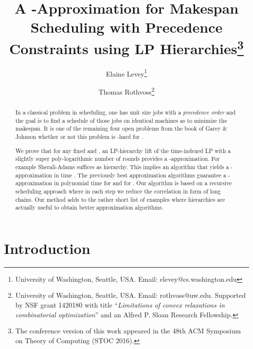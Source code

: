 \documentclass[11pt,letterpaper,oneside,english]{article}
\title{A -Approximation for Makespan Scheduling with Precedence Constraints using LP Hierarchies\footnote{The conference version of this work appeared in the 48th ACM Symposium on Theory of Computing (STOC 2016).}}
\date{}
\author{Elaine Levey\thanks{University of Washington, Seattle, USA. Email: elevey@cs.washington.edu} \and Thomas Rothvo{ss}\thanks{University of Washington, Seattle, USA. Email: rothvoss@uw.edu. Supported by NSF grant 1420180 with title ``\emph{Limitations of convex relaxations in combinatorial optimization}'' and an Alfred P. Sloan Research Fellowship.}}
\theoremstyle{theorem}
\begin{document}
\maketitle


\begin{abstract}
\noindent 
In a classical problem in scheduling, 
one has  unit size jobs with a \emph{precedence order} and the goal is to find 
a schedule of those jobs on   identical machines as to minimize the makespan. It is one of the remaining four open problems from the book of Garey \& Johnson whether or not this problem is -hard for . 
 
We prove that for any fixed  and , an LP-hierarchy lift of the time-indexed LP with a slightly super poly-logarithmic number of  rounds provides a -approximation. 
For example Sherali-Adams suffices as hierarchy. This implies an algorithm that yields a -approximation in time . 
The previously best approximation algorithms guarantee
a -approximation in polynomial time for  and  for . 
Our algorithm is based on a recursive scheduling approach where in each step we reduce the correlation in form of long chains. Our method adds to the rather short list of examples where hierarchies are actually useful to obtain better approximation algorithms. 
\end{abstract}



\section{Introduction}
\end{document}
